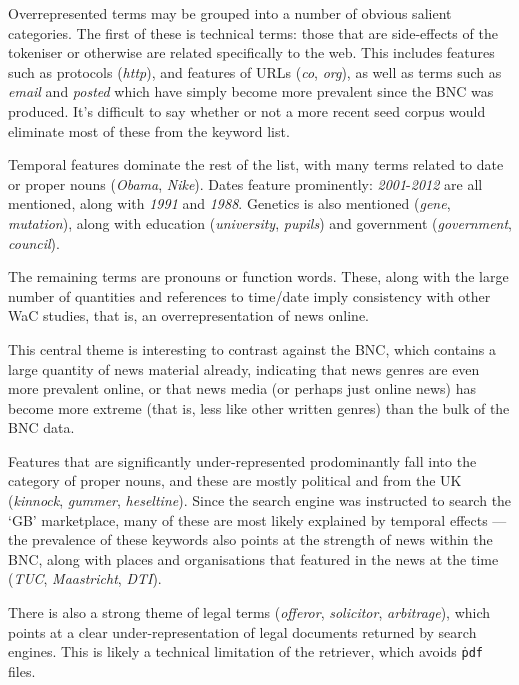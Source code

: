 Overrepresented terms may be grouped into a number of obvious salient categories.  The first of these is technical terms: those that are side-effects of the tokeniser or otherwise are related specifically to the web.  This includes features such as protocols (\textsl{http}), and features of URLs (\textsl{co}, \textsl{org}), as well as terms such as \textsl{email} and \textsl{posted} which have simply become more prevalent since the BNC was produced.  It's difficult to say whether or not a more recent seed corpus would eliminate most of these from the keyword list.

Temporal features dominate the rest of the list, with many terms related to date or proper nouns (\textsl{Obama}, \textsl{Nike}).  Dates feature prominently: \textsl{2001}-\textsl{2012} are all mentioned, along with \textsl{1991} and \textsl{1988}.  Genetics is also mentioned (\textsl{gene}, \textsl{mutation}), along with education (\textsl{university}, \textsl{pupils}) and government (\textsl{government}, \textsl{council}).

The remaining terms are pronouns or function words.  These, along with the large number of quantities and references to time/date imply consistency with other WaC studies, that is, an overrepresentation of news online.

This central theme is interesting to contrast against the BNC, which contains a large quantity of news material already, indicating that news genres are even more prevalent online, or that news media (or perhaps just online news) has become more extreme (that is, less like other written genres) than the bulk of the BNC data.

Features that are significantly under-represented prodominantly fall into the category of proper nouns, and these are mostly political and from the UK (\textsl{kinnock}, \textsl{gummer}, \textsl{heseltine}).  Since the search engine was instructed to search the `GB' marketplace, many of these are most likely explained by temporal effects --- the prevalence of these keywords also points at the strength of news within the BNC, along with places and organisations that featured in the news at the time (\textsl{TUC}, \textsl{Maastricht}, \textsl{DTI}).

There is also a strong theme of legal terms (\textsl{offeror}, \textsl{solicitor}, \textsl{arbitrage}), which points at a clear under-representation of legal documents returned by search engines.  This is likely a technical limitation of the retriever, which avoids \texttt{\.pdf} files.

